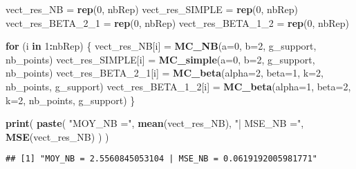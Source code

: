 \documentclass[]{article}
\newenvironment{Shaded}{\begin{snugshade}}{\end{snugshade}}
\newcommand{\ControlFlowTok}[1]{\textcolor[rgb]{0.13,0.29,0.53}{\textbf{#1}}}
\newcommand{\DataTypeTok}[1]{\textcolor[rgb]{0.13,0.29,0.53}{#1}}
\newcommand{\DecValTok}[1]{\textcolor[rgb]{0.00,0.00,0.81}{#1}}
\newcommand{\KeywordTok}[1]{\textcolor[rgb]{0.13,0.29,0.53}{\textbf{#1}}}
\newcommand{\NormalTok}[1]{#1}
\newcommand{\OperatorTok}[1]{\textcolor[rgb]{0.81,0.36,0.00}{\textbf{#1}}}
\newcommand{\StringTok}[1]{\textcolor[rgb]{0.31,0.60,0.02}{#1}}
\begin{document}
\begin{Shaded}
\begin{Highlighting}[]
\NormalTok{vect_res_NB =}\StringTok{ }\KeywordTok{rep}\NormalTok{(}\DecValTok{0}\NormalTok{, nbRep)}
\NormalTok{vect_res_SIMPLE =}\StringTok{ }\KeywordTok{rep}\NormalTok{(}\DecValTok{0}\NormalTok{, nbRep)}
\NormalTok{vect_res_BETA_}\DecValTok{2}\NormalTok{_}\DecValTok{1}\NormalTok{ =}\StringTok{ }\KeywordTok{rep}\NormalTok{(}\DecValTok{0}\NormalTok{, nbRep)}
\NormalTok{vect_res_BETA_}\DecValTok{1}\NormalTok{_}\DecValTok{2}\NormalTok{ =}\StringTok{ }\KeywordTok{rep}\NormalTok{(}\DecValTok{0}\NormalTok{, nbRep)}

\ControlFlowTok{for}\NormalTok{ (i }\ControlFlowTok{in} \DecValTok{1}\OperatorTok{:}\NormalTok{nbRep)}
\NormalTok{\{}
\NormalTok{  vect_res_NB[i] =}\StringTok{ }\KeywordTok{MC_NB}\NormalTok{(}\DataTypeTok{a=}\DecValTok{0}\NormalTok{, }\DataTypeTok{b=}\DecValTok{2}\NormalTok{, g_support, nb_points)}
\NormalTok{  vect_res_SIMPLE[i] =}\StringTok{ }\KeywordTok{MC_simple}\NormalTok{(}\DataTypeTok{a=}\DecValTok{0}\NormalTok{, }\DataTypeTok{b=}\DecValTok{2}\NormalTok{, g_support, nb_points)}
\NormalTok{  vect_res_BETA_}\DecValTok{2}\NormalTok{_}\DecValTok{1}\NormalTok{[i] =}\StringTok{ }\KeywordTok{MC_beta}\NormalTok{(}\DataTypeTok{alpha=}\DecValTok{2}\NormalTok{, }\DataTypeTok{beta=}\DecValTok{1}\NormalTok{, }\DataTypeTok{k=}\DecValTok{2}\NormalTok{, nb_points, g_support)}
\NormalTok{  vect_res_BETA_}\DecValTok{1}\NormalTok{_}\DecValTok{2}\NormalTok{[i] =}\StringTok{ }\KeywordTok{MC_beta}\NormalTok{(}\DataTypeTok{alpha=}\DecValTok{1}\NormalTok{, }\DataTypeTok{beta=}\DecValTok{2}\NormalTok{, }\DataTypeTok{k=}\DecValTok{2}\NormalTok{, nb_points, g_support)}
\NormalTok{\}}
\end{Highlighting}
\end{Shaded}

\begin{Shaded}
\begin{Highlighting}[]
\KeywordTok{print}\NormalTok{( }\KeywordTok{paste}\NormalTok{( }\StringTok{"MOY_NB ="}\NormalTok{, }\KeywordTok{mean}\NormalTok{(vect_res_NB), }\StringTok{"| MSE_NB ="}\NormalTok{, }\KeywordTok{MSE}\NormalTok{(vect_res_NB) ) )}
\end{Highlighting}
\end{Shaded}

\begin{verbatim}
## [1] "MOY_NB = 2.5560845053104 | MSE_NB = 0.0619192005981771"
\end{verbatim}
\end{document}
